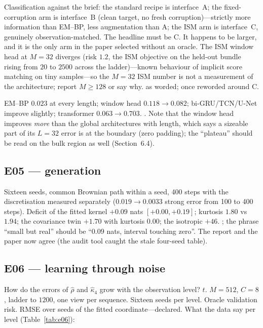Classification against the brief: the standard recipe is interface~A; the fixed-corruption arm is interface~B (clean target, no fresh corruption)---strictly more information than EM--BP, less augmentation than A; the ISM arm is interface~C, genuinely observation-matched. The headline must be C. It happens to be larger, and it is the only arm in the paper selected without an oracle. The ISM window head at $M=32$ diverges (risk $1.2$, the ISM objective on the held-out bundle rising from $20$ to $2500$ across the ladder)---known behaviour of implicit score matching on tiny samples---so the $M=32$ ISM number is not a measurement of the architecture; report $M\ge128$ or say why.  as worded;  once reworded around C.

 EM--BP $0.023$ at every length; window head $0.118\to0.082$; bi-GRU/TCN/U-Net improve slightly; transformer $0.063\to0.703$. . Note that the window head improves \emph{more} than the global architectures with length, which says a sizeable part of its $L=32$ error is at the boundary (zero padding); the ``plateau'' should be read on the bulk region as well (Section~6.4).

\subsection{E05 --- generation}
Sixteen seeds, common Brownian path within a seed, 400 steps with the discretisation measured separately ($0.019\to0.0033$ strong error from 100 to 400 steps). Deficit of the fitted kernel $+0.09$ nats $[+0.00,+0.19]$; kurtosis $1.80$ vs $1.94$; the covariance twin $+1.70$ with kurtosis $0.00$; the isotropic $+46$. ; the phrase ``small but real'' should be ``$0.09$ nats, interval touching zero''. The report and the paper now agree (the audit tool caught the stale four-seed table).

\subsection{E06 --- learning through noise}
 How do the errors of $\hat\rho$ and $\hat\kappa_4$ grow with the observation level?  $t$.  $M=512$, $C=8$, ladder to $1200$, one view per sequence.  Sixteen seeds per level.  Oracle validation risk.  RMSE over seeds of the fitted coordinate---declared. What the data say per level (Table~\ref{tab:e06}):

